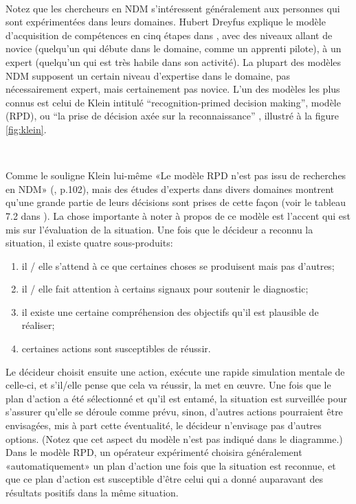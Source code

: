 ~\par
Notez que les chercheurs en NDM s'intéressent généralement aux personnes qui sont expérimentées dans leurs domaines. Hubert Dreyfus explique le modèle d’acquisition de compétences en cinq étapes dans \parencite{dreyfus2014intuitive}, avec des niveaux allant de novice (quelqu'un qui débute dans  le domaine, comme un apprenti pilote), à un expert (quelqu'un qui est très habile dans son activité). La plupart des modèles NDM supposent un certain niveau d'expertise dans le domaine, pas nécessairement expert, mais certainement pas novice. L’un des modèles les plus connus est celui de Klein intitulé  “recognition-primed decision making”, modèle (RPD), ou “la prise de décision axée sur la reconnaissance” \parencite{klein2017sources}, illustré à la figure \ref{fig:klein}.

~\par 
Comme le souligne Klein lui-même «Le modèle RPD n'est pas issu de recherches en NDM» (\parencite{klein2017sources}, p.102), mais des études d’experts dans divers domaines montrent qu’une grande partie de leurs décisions sont prises de cette façon (voir le tableau 7.2 dans \parencite{klein2017sources}). La chose importante à noter à propos de ce modèle est l'accent qui est mis sur l'évaluation de la situation. Une fois que le décideur a reconnu la situation, il existe quatre sous-produits:

\begin{enumerate}

\item il / elle s'attend à ce que certaines choses se produisent mais pas d'autres;
\item il / elle fait attention à certains signaux pour soutenir le diagnostic;
\item il existe une certaine compréhension des objectifs qu'il est plausible de réaliser;
\item certaines actions sont susceptibles de réussir.
\end{enumerate}

Le décideur choisit ensuite une action, exécute une rapide simulation mentale de
celle-ci, et s'il/elle pense que cela va réussir, la met en œuvre. Une fois que le plan d’action  a été sélectionné et qu’il est entamé, la situation est surveillée pour s’assurer qu’elle se déroule comme prévu, sinon, d’autres actions pourraient être envisagées, mis à part cette éventualité, le décideur n'envisage pas d'autres options. (Notez que cet aspect du modèle n’est pas indiqué dans le diagramme.) Dans le modèle RPD, un opérateur expérimenté
choisira généralement «automatiquement» un plan d’action une fois que la situation est
reconnue, et que ce plan d’action est susceptible d’être celui qui a donné  auparavant
des résultats positifs dans la même situation.


